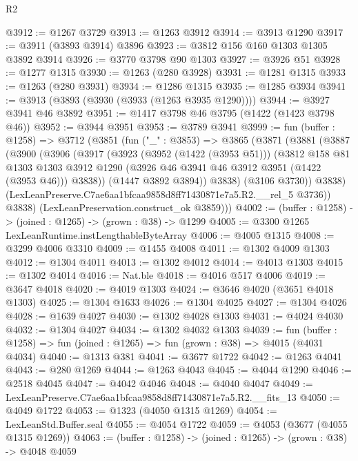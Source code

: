 \begin{lexlean}{R2}
\begin{coremodule}
@3912 := @1267 @3729
@3913 := @1263 @3912
@3914 := @3913 @1290
@3917 := @3911 (@3893 @3914) @3896
@3923 := @3812 @156 @160 @1303 @1305 @3892 @3914
@3926 := @3770 @3798 @90 @1303
@3927 := @3926 @51
@3928 := @1277 @1315
@3930 := @1263 (@280 @3928)
@3931 := @1281 @1315
@3933 := @1263 (@280 @3931)
@3934 := @1286 @1315
@3935 := @1285 @3934
@3941 := @3913 (@3893 (@3930 (@3933 (@1263 @3935 @1290))))
@3944 := @3927 @3941 @46 @3892
@3951 := @1417 @3798 @46 @3795 (@1422 (@1423 @3798 @46))
@3952 := @3944 @3951
@3953 := @3789 @3941
@3999 := fun (buffer : @1258) =>
  @3712
    (@3851
      (fun ("_" : @3853) =>
      @3865
        (@3871
          (@3881
            (@3887
              (@3900
                (@3906
                  (@3917
                    (@3923
                      (@3952 (@1422 (@3953 @51)))
                      (@3812
                        @158
                        @81
                        @1303
                        @1303
                        @3912
                        @1290
                        (@3926 @46 @3941 @46 @3912 @3951 (@1422 (@3953 @46)))
                        @3838))
                    (@1447 @3892 @3894))
                  @3838)
                (@3106 @3730))
              @3838)
            (LexLeanPreserve.C7ae6aa1bfcaa9858d8ff71430871e7a5.R2.__rel_5 @3736))
          @3838)
        (LexLeanPreservation.construct_ok @3859)))
@4002 := (buffer : @1258) -> (joined : @1265) -> (grown : @38) -> @1299
@4005 := @3300 @1265 LexLeanRuntime.instLengthableByteArray
@4006 := @4005 @1315
@4008 := @3299 @4006 @3310
@4009 := @1455 @4008
@4011 := @1302 @4009 @1303
@4012 := @1304 @4011
@4013 := @1302 @4012
@4014 := @4013 @1303
@4015 := @1302 @4014
@4016 := Nat.ble
@4018 := @4016 @517 @4006
@4019 := @3647 @4018
@4020 := @4019 @1303
@4024 := @3646 @4020 (@3651 @4018 @1303)
@4025 := @1304 @1633
@4026 := @1304 @4025
@4027 := @1304 @4026
@4028 := @1639 @4027
@4030 := @1302 @4028 @1303
@4031 := @4024 @4030
@4032 := @1304 @4027
@4034 := @1302 @4032 @1303
@4039 := fun (buffer : @1258) => fun (joined : @1265) => fun (grown : @38) => @4015 (@4031 @4034)
@4040 := @1313 @381
@4041 := @3677 @1722
@4042 := @1263 @4041
@4043 := @280 @1269
@4044 := @1263 @4043
@4045 := @4044 @1290
@4046 := @2518 @4045
@4047 := @4042 @4046
@4048 := @4040 @4047
@4049 := LexLeanPreserve.C7ae6aa1bfcaa9858d8ff71430871e7a5.R2.__fits_13
@4050 := @4049 @1722
@4053 := @1323 (@4050 @1315 @1269)
@4054 := LexLeanStd.Buffer.seal
@4055 := @4054 @1722
@4059 := @4053 (@3677 (@4055 @1315 @1269))
@4063 := (buffer : @1258) -> (joined : @1265) -> (grown : @38) -> @4048 @4059

\end{coremodule}
\end{lexlean}
